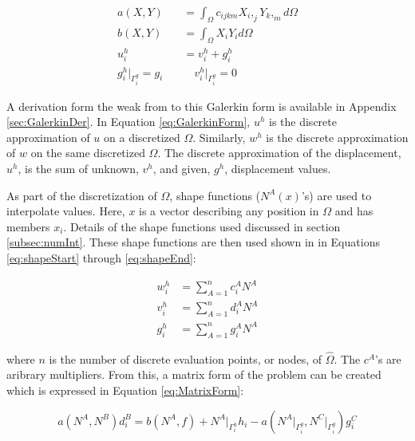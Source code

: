 \documentclass[a4paper, 12pt]{article}
\begin{document}
\begin{align} 
a( X, Y ) &= 
  \int_{\Omega} c_{ijkm} X_{i},_{j} Y_{k},_{m} d\Omega 
    \label{eq:GalerkinCont}                                           \\
b( X, Y ) &= 
  \int_{\Omega} X_{i} Y_{i} d\Omega 
    \label{eq:GalerkinForce}                                          \\
u^{h}_{i} &= 
  v^{h}_{i} + g^{h}_{i} 
  \label{eq:GalerkinUh}                                               \\
g^{h}_{i}\Big|_{\Gamma^{g}_{i}} = g_{i} 
  \quad & \quad
  v^{h}_{i}\Big|_{\Gamma^{g}_{i}} = 0
  \label{eq:GalerkinContFin}                                       %
\end{align}

\noindent
A derivation form the weak from to this Galerkin form 
is available in Appendix \ref{sec:GalerkinDer}.
In Equation \ref{eq:GalerkinForm}, $u^{h}$ is the discrete
approximation of $u$ on a discretized $\Omega$. Similarly,
$w^{h}$ is the discrete approximation of $w$ on the same 
discretized $\Omega$. The discrete approximation of
the displacement, $u^{h}$, is the sum of unknown, $v^{h}$, 
and given, $g^{h}$, displacement values. 

As part of the discretization of $\Omega$, shape functions
($N^{A}(x)$'s) are used to interpolate values. Here, $x$
is a vector describing any position in $\Omega$ and has members $x_i$. 
Details of the shape functions used discussed in section \ref{subsec:numInt}.
These shape functions are then used shown in in Equations
\ref{eq:shapeStart} through \ref{eq:shapeEnd}:

\begin{align}
w^{h}_i &= \sum_{A=1}^{n} c^{A}_i N^{A} 
  \label{eq:shapeStart}                       \\
v^{h}_i &= \sum_{A=1}^{n} d^{A}_i N^{A} 
  \label{eq:shapeUnks}                         \\
g^{h}_i &= \sum_{A=1}^{n} g^{A}_i N^{A} 
  \label{eq:shapeEnd}
\end{align}

\noindent
where $n$ is the number of discrete evaluation points, or nodes,
of $\hat{\Omega}$. The $c^{A}$'s are aribrary multipliers. From this, a matrix 
form of the problem can be created which is expressed in 
Equation \ref{eq:MatrixForm}:

\begin{equation} \label{eq:MatrixForm}
a( N^A, N^B) d^{B}_{i} = 
  b( N^A, f) +
  N^A\Big|_{\Gamma_{i}^{h}} h_i -
  a( N^A\Big|_{\Gamma_{i}^{g}} , N^C\Big|_{\Gamma_{i}^{g}} ) g_{i}^C
\end{equation} 
\end{document}
